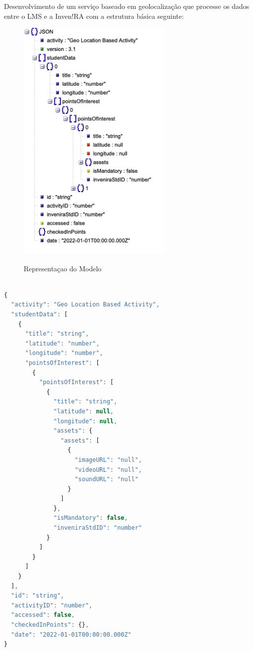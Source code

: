 \documentclass[12pt,a4paper, brazil]{article}
\begin{document}
Desenvolvimento de um serviço baseado em geolocalização que processe os dados entre o LMS e a Inven!RA com a estrutura básica seguinte:

\begin{figure}[ht]
    \centering
    \caption{Representaçao do Modelo}
    \includegraphics[width=0.67\textwidth]{json.png}
    \label{fig:exemplo}
\end{figure}

\pagebreak
\begin{lstlisting}[language=javascript]

{
  "activity": "Geo Location Based Activity",
  "studentData": [
    {
      "title": "string",
      "latitude": "number",
      "longitude": "number",
      "pointsOfInterest": [
        {
          "pointsOfInterest": [
            {
              "title": "string",
              "latitude": null,
              "longitude": null,
              "assets": {
                "assets": [
                  {
                    "imageURL": "null",
                    "videoURL": "null",
                    "soundURL": "null"
                  }
                ]
              },
              "isMandatory": false,
              "inveniraStdID": "number"
            }
          ]
        }
      ]
    }
  ],
  "id": "string",
  "activityID": "number",
  "accessed": false,
  "checkedInPoints": {},
  "date": "2022-01-01T00:00:00.000Z"
}

\end{lstlisting}

\printbibliography
\end{document}
